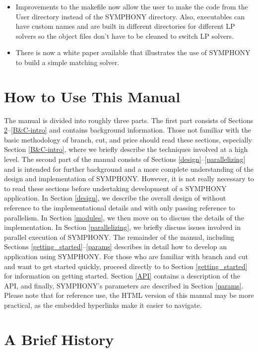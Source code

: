 \begin{itemize}
\item Improvements to the makefile now allow the user to make the code from the 
User directory instead of the SYMPHONY directory. Also, executables can have
custom names and are built in different directories for different LP solvers
so the object files don't have to be cleaned to switch LP solvers.

\item There is now a white paper available that illustrates the use of SYMPHONY
to build a simple matching solver.

\end{itemize}

\section{How to Use This Manual}

The manual is divided into roughly three parts. The first part consists of
Sections \ref{history}--\ref{B&C-intro} and contains background
information. Those not familiar with the basic methodology of branch, cut, and
price should read these sections, especially Section \ref{B&C-intro}, where we
briefly describe the techniques involved at a high level.  The second part of
the manual consists of Sections \ref{design}--\ref{parallelizing} and is
intended for further background and a more complete understanding of the
design and implementation of SYMPHONY. However, it is not really necessary to
to read these sections before undertaking development of a SYMPHONY
application. In Section \ref{design}, we describe the overall design of
without reference to the implementational details and with only passing
reference to parallelism.  In Section \ref{modules}, we then move on to
discuss the details of the implementation. In Section \ref{parallelizing}, we
briefly discuss issues involved in parallel execution of SYMPHONY. The
remainder of the manual, including Sections \ref{getting_started}--\ref{params}
describes in detail how to develop an application using SYMPHONY. For those
who are familiar with branch and cut and want to get started quickly, proceed
directly to to Section \ref{getting_started} for information on getting
started. Section \ref{API} contains a description of the API, and finally,
SYMPHONY's parameters are described in Section \ref{params}. Please note that
for reference use, the HTML version of this manual may be more practical, as
the embedded hyperlinks make it easier to navigate.

\section{A Brief History}
\label{history}


